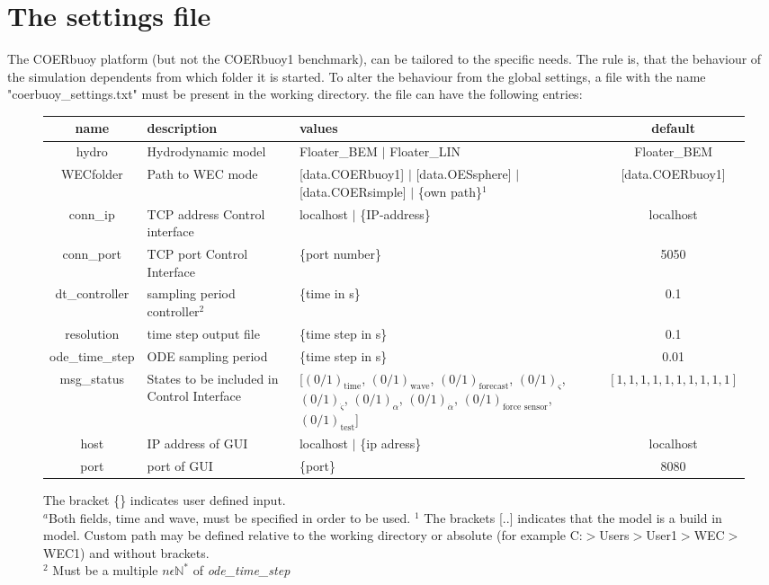\documentclass[oneside,10pt,a4paper]{book}
\begin{document}
\section{The settings file}\label{sec:settings}
The COERbuoy platform (but not the COERbuoy1 benchmark), can be tailored to the specific needs. The rule is, that the behaviour of the simulation dependents from which folder it is started. To alter the behaviour from the global settings, a file with the name "coerbuoy\_settings.txt" must be present in the working directory. the file can have the following entries:
\begin{figure}[h!]\label{tab:param_settings}
	\begin{tabular}{|c|p{3cm}|p{6cm}|c|}
		\hline
		name & description & values & default \\
		\hline
		hydro&Hydrodynamic model& Floater\_BEM $\vert$ Floater\_LIN & Floater\_BEM \\
		\hline
		WECfolder&Path to WEC mode&[data.COERbuoy1] $\vert$ [data.OESsphere] $\vert$ [data.COERsimple] $\vert$ \{own path\}$^1$&[data.COERbuoy1]\\
		\hline
		conn\_ip&TCP address Control interface&localhost $\vert$ \{IP-address\}&localhost\\
		\hline
		conn\_port&TCP port Control Interface&\{port number\}&5050\\
		\hline
		dt\_controller&sampling period controller$^2$&\{time in s\}&0.1\\
		\hline
		resolution&time step output file&\{time step in s\}&0.1\\
		\hline
		ode\_time\_step&ODE sampling period&\{time step in s\}&0.01\\
		\hline
		msg\_status&States to be included in Control Interface&[$(0/1)_\text{time}$, $(0/1)_\text{wave}$, $(0/1)_\text{forecast}$, $(0/1)_{ \varsigma }$, $(0/1)_{\dot{\varsigma}}$, $(0/1)_\alpha$, $(0/1)_{\dot{\alpha}}$, $(0/1)_{\text{force sensor}}$, $(0/1)_{\text{test}}$]&$[1,1,1,1,1,1,1,1,1,1]$\\
			\hline
		host&IP address of GUI&localhost $\vert$ \{ip adress\}&localhost\\
		\hline
		port&port of GUI&\{port\}&8080\\
		\hline
	\end{tabular}
	\caption{The bracket \{\} indicates user defined input.\\$^a$Both fields, time and wave, must be specified in order to be used.
		$^1$ The brackets [..] indicates that the model is a build in model. Custom path may be defined relative to the working directory or absolute (for example C:$>$Users$>$User1$>$WEC$>$WEC1) and without brackets.\\
	$^2$ Must be a multiple $n\epsilon\mathbb{N}^*$ of \textit{ode\_time\_step}}
	\end{figure}
	
\end{document}
